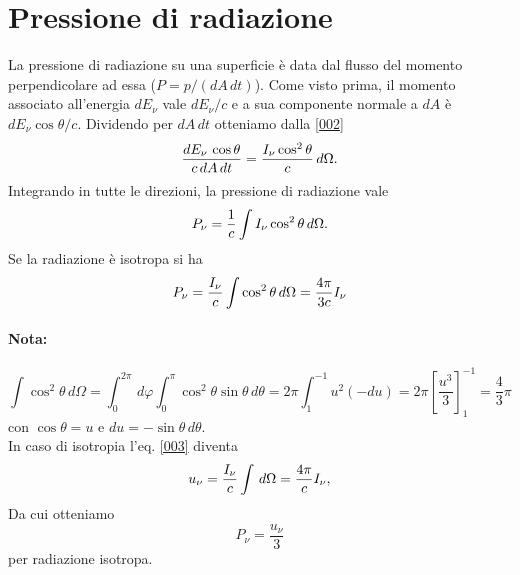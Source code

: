 \section{Pressione di radiazione}
La pressione di radiazione su una superficie è data dal flusso del momento perpendicolare ad essa ($P=p/(dA\,dt)$). Come visto prima, il momento associato all'energia $dE_\nu$ vale $dE_\nu/c$ e a sua componente normale a $dA$ è $dE_\nu \cos\theta /c$. Dividendo per $dA\,dt$ otteniamo dalla \ref{002}
\begin{equation*}
    \frac{dE_\nu\,\cos\theta}{c\,dA\,dt}=\frac{I_\nu\cos^2\theta}{c}\,d\Omega.
\end{equation*}
Integrando in tutte le direzioni, la pressione di radiazione vale
\begin{equation*}
    P_\nu=\frac{1}{c}\int I_\nu\cos^2\theta\,d\Omega.
\end{equation*}
Se la radiazione è isotropa si ha
\begin{equation*}
    P_\nu=\frac{I_\nu}{c}\int\cos^2\theta\,d\Omega = \frac{4\pi}{3c}I_\nu\\
\end{equation*}
\paragraph{Nota:}
\begin{equation*}
    \int\cos^2\theta\,d\Omega=\int_0^{2\pi}\,d\varphi \int_0^\pi \cos^2\theta\sin\theta\,d\theta =2\pi\int_{1}^{-1}u^2(-du)=2\pi\left[\frac{u^3}{3}\right]_{1}^{-1}=\frac{4}{3}\pi
\end{equation*}
con $\cos\theta=u$ e $du=-\sin\theta\,d\theta$.\\
In caso di isotropia l'eq. \ref{003} diventa
\begin{equation*}
    u_\nu = \frac{I_\nu}{c}\int\,d\Omega = \frac{4\pi}{c}I_\nu,
\end{equation*}
Da cui otteniamo
\begin{equation*}
    P_\nu=\frac{u_\nu}{3}
\end{equation*}
per radiazione isotropa.
